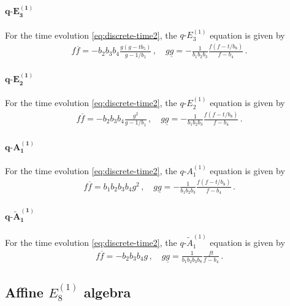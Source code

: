 \documentclass[11pt, a4paper]{article}
\theoremstyle{definition}
\begin{document}
\paragraph{$ \boldsymbol{q\text{-}E_3^{(1)}} $}
For the time evolution \eqref{eq:discrete-time2}, the $ q\text{-}E_3^{(1)} $ equation is given by
\begin{align}\label{eq:qE3}
    f\overline{f} = -b_2b_3b_4 \frac{g(g-tb_5)}{g-1/b_1} \, , \quad
    g\underline{g} = -\frac{1}{b_1b_2b_3} \frac{f(f-t/b_8)}{f-b_4} \, .
\end{align}


\paragraph{$ \boldsymbol{q\text{-}E_2^{(1)}} $}
For the time evolution \eqref{eq:discrete-time2}, the $ q\text{-}E_2^{(1)} $ equation is given by
\begin{align}\label{eq:qE2}
    f\overline{f} = -b_2b_3b_4 \frac{g^2}{g-1/b_1} \, , \quad
    g\underline{g} = -\frac{1}{b_1b_2b_3} \frac{f(f-t/b_8)}{f-b_4} \, .
\end{align}


\paragraph{$ \boldsymbol{q\text{-}A_1^{(1)}} $}
For the time evolution \eqref{eq:discrete-time2}, the $ q\text{-}A_1^{(1)} $ equation is given by
\begin{align}\label{eq:qA1}
    f\overline{f} = b_1b_2b_3b_4 g^2 \, , \quad
    g\underline{g} = -\frac{1}{b_1b_2b_3} \frac{f(f-t/b_8)}{f-b_4} \, .
\end{align}


\paragraph{$ \boldsymbol{q\text{-}\tilde{A}_1^{(1)}} $}
For the time evolution \eqref{eq:discrete-time2}, the $ q\text{-}\tilde{A}_1^{(1)} $ equation is given by
\begin{align}\label{eq:qA1t}
    f\overline{f} = -b_2b_3b_4 g \, , \quad
    g\underline{g} = \frac{1}{b_1b_2b_3b_8} \frac{f t}{f-b_4} \, .
\end{align}




\subsection{Affine \texorpdfstring{$ E_8^{(1)} $}{E8(1)} algebra}
\end{document}
